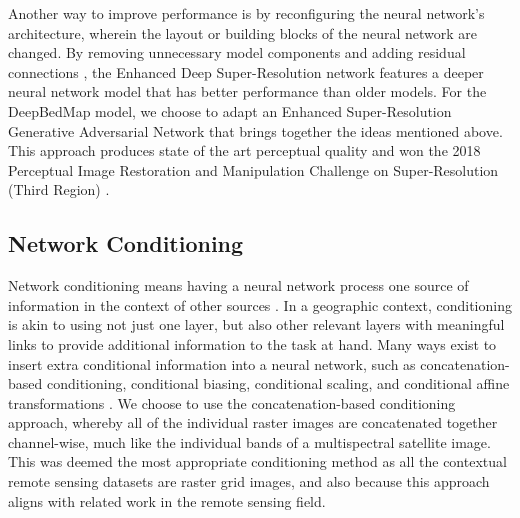 \documentclass[tc, manuscript]{copernicus}
\begin{document}
Another way to improve performance is by reconfiguring the neural network's architecture, wherein the layout or building blocks of the neural network are changed.
By removing unnecessary model components and adding residual connections \citep{HeDeepResidualLearning2015}, the Enhanced Deep Super-Resolution network \citep[EDSR,][]{LimEnhancedDeepResidual2017} features a deeper neural network model that has better performance than older models.
For the DeepBedMap model, we choose to adapt an Enhanced Super-Resolution Generative Adversarial Network \citep[ESRGAN,][]{WangESRGANEnhancedSuperResolution2019} that brings together the ideas mentioned above.
This approach produces state of the art perceptual quality and won the 2018 Perceptual Image Restoration and Manipulation Challenge on Super-Resolution (Third Region) \citep{Blau2018PIRMChallenge2018}.

\subsection{Network Conditioning} \label{section:networkconditioning}

Network conditioning means having a neural network process one source of information in the context of other sources \citep{DumoulinFeaturewisetransformations2018}.
In a geographic context, conditioning is akin to using not just one layer, but also other relevant layers with meaningful links to provide additional information to the task at hand.
Many ways exist to insert extra conditional information into a neural network, such as concatenation-based conditioning, conditional biasing, conditional scaling, and conditional affine transformations \citep{DumoulinFeaturewisetransformations2018}.
We choose to use the concatenation-based conditioning approach, whereby all of the individual raster images are concatenated together channel-wise, much like the individual bands of a multispectral satellite image.
This was deemed the most appropriate conditioning method as all the contextual remote sensing datasets are raster grid images, and also because this approach aligns with related work in the remote sensing field.
\end{document}
